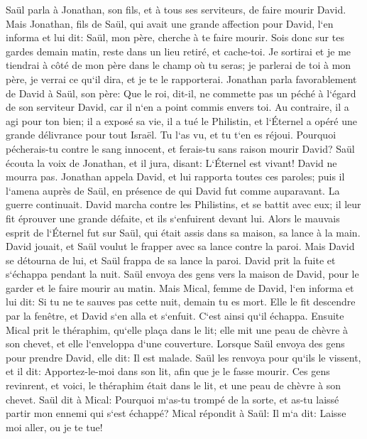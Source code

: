 \verse Saül parla à Jonathan, son fils, et à tous ses serviteurs, de faire mourir David. Mais Jonathan, fils de Saül, qui avait une grande affection pour David, 
\verse l`en informa et lui dit: Saül, mon père, cherche à te faire mourir. Sois donc sur tes gardes demain matin, reste dans un lieu retiré, et cache-toi. 
\verse Je sortirai et je me tiendrai à côté de mon père dans le champ où tu seras; je parlerai de toi à mon père, je verrai ce qu`il dira, et je te le rapporterai. 
\verse Jonathan parla favorablement de David à Saül, son père: Que le roi, dit-il, ne commette pas un péché à l`égard de son serviteur David, car il n`en a point commis envers toi. Au contraire, il a agi pour ton bien; 
\verse il a exposé sa vie, il a tué le Philistin, et l`Éternel a opéré une grande délivrance pour tout Israël. Tu l`as vu, et tu t`en es réjoui. Pourquoi pécherais-tu contre le sang innocent, et ferais-tu sans raison mourir David? 
\verse Saül écouta la voix de Jonathan, et il jura, disant: L`Éternel est vivant! David ne mourra pas. 
\verse Jonathan appela David, et lui rapporta toutes ces paroles; puis il l`amena auprès de Saül, en présence de qui David fut comme auparavant. 
\verse La guerre continuait. David marcha contre les Philistins, et se battit avec eux; il leur fit éprouver une grande défaite, et ils s`enfuirent devant lui. 
\verse Alors le mauvais esprit de l`Éternel fut sur Saül, qui était assis dans sa maison, sa lance à la main. 
\verse David jouait, et Saül voulut le frapper avec sa lance contre la paroi. Mais David se détourna de lui, et Saül frappa de sa lance la paroi. David prit la fuite et s`échappa pendant la nuit. 
\verse Saül envoya des gens vers la maison de David, pour le garder et le faire mourir au matin. Mais Mical, femme de David, l`en informa et lui dit: Si tu ne te sauves pas cette nuit, demain tu es mort. 
\verse Elle le fit descendre par la fenêtre, et David s`en alla et s`enfuit. C`est ainsi qu`il échappa. 
\verse Ensuite Mical prit le théraphim, qu`elle plaça dans le lit; elle mit une peau de chèvre à son chevet, et elle l`enveloppa d`une couverture. 
\verse Lorsque Saül envoya des gens pour prendre David, elle dit: Il est malade. 
\verse Saül les renvoya pour qu`ils le vissent, et il dit: Apportez-le-moi dans son lit, afin que je le fasse mourir. 
\verse Ces gens revinrent, et voici, le théraphim était dans le lit, et une peau de chèvre à son chevet. 
\verse Saül dit à Mical: Pourquoi m`as-tu trompé de la sorte, et as-tu laissé partir mon ennemi qui s`est échappé? Mical répondit à Saül: Il m`a dit: Laisse moi aller, ou je te tue! 
